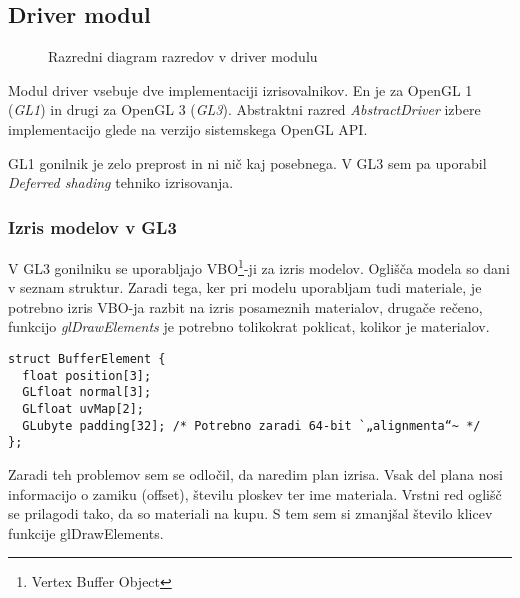 \documentclass[a4paper]{article}
\begin{document}
\subsection{Driver modul}
\begin{figure}
  \centering
  
  \label{graf:class_driver}
  \caption{Razredni diagram razredov v driver modulu}
\end{figure}

Modul driver vsebuje dve implementaciji izrisovalnikov. En je za OpenGL 1 (\emph{GL1}) in drugi za OpenGL 3 (\emph{GL3}). Abstraktni razred \emph{AbstractDriver} izbere implementacijo glede na verzijo sistemskega OpenGL API.

GL1 gonilnik je zelo preprost in ni nič kaj posebnega. V GL3 sem pa uporabil \emph{Deferred shading} tehniko izrisovanja.

\subsubsection{Izris modelov v GL3}
V GL3 gonilniku se uporabljajo VBO\footnote{Vertex Buffer Object}-ji za izris modelov. Oglišča modela so dani v seznam struktur. Zaradi tega, ker pri modelu uporabljam tudi materiale, je potrebno izris VBO-ja razbit na izris posameznih materialov, drugače rečeno, funkcijo \emph{glDrawElements} je potrebno tolikokrat poklicat, kolikor je materialov.

\begin{lstlisting}[caption={Struktura posameznega oglišča}]
struct BufferElement {
  float position[3];
  GLfloat normal[3];
  GLfloat uvMap[2];
  GLubyte padding[32]; /* Potrebno zaradi 64-bit `„alignmenta“~ */
};
\end{lstlisting}

Zaradi teh problemov sem se odločil, da naredim plan izrisa. Vsak del plana nosi informacijo o zamiku (offset), številu ploskev ter ime materiala. Vrstni red oglišč se prilagodi tako, da so materiali na kupu. S tem sem si zmanjšal število klicev funkcije glDrawElements.
\end{document}
